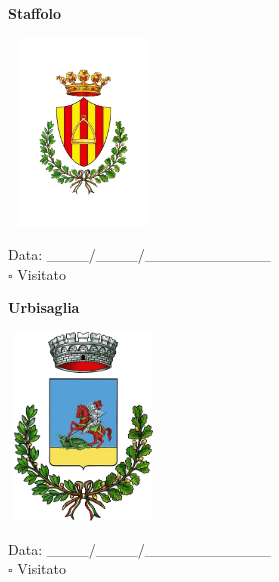 \documentclass[a5paper,12pt]{article}
\begin{document}
\newpage

\noindent
\begin{minipage}[t]{0.45\textwidth}
    \begin{center}
        \textbf{Staffolo}
    \end{center}
    \vspace{-0.5cm} %
    \begin{center}
        \includegraphics[height= 5cm, width=4cm]{Marche/Stemma Staffolo.png}
    \end{center}
    \vspace{-0.4cm} %
    \begin{flushleft}
        Data: \_\_\_\_/\_\_\_\_/\_\_\_\_\_\_\_\_\_\_\_\_ \\
        $\square$ Visitato
    \end{flushleft}
\end{minipage}
\hfill
\noindent
\begin{minipage}[t]{0.45\textwidth}
    \begin{center}
        \textbf{Urbisaglia}
    \end{center}
    \vspace{-0.5cm} %
    \begin{center}
        \includegraphics[height= 5cm, width=4cm]{Marche/Stemma Urbisaglia.png}
    \end{center}
    \vspace{-0.4cm} %
    \begin{flushleft}
        Data: \_\_\_\_/\_\_\_\_/\_\_\_\_\_\_\_\_\_\_\_\_ \\
        $\square$ Visitato
    \end{flushleft}
\end{minipage}
\end{document}
